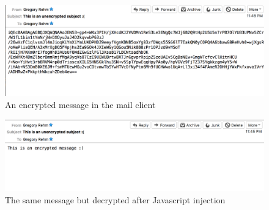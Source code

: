 \documentclass[10pt]{article}
\begin{document}
\begin{figure}[h]
    \centering
    \includegraphics[scale=.5]{encrypted-msg.png}
    \caption{An encrypted message in the mail client}
    \label{fig:Encrypted-client}
\end{figure}
\begin{figure}[h]
    \centering
    \includegraphics[scale=.5]{decrypted-msg.png}
    \caption{The same message but decrypted after Javascript injection}
    \label{fig:Decrypted-client}
\end{figure}
\end{document}
